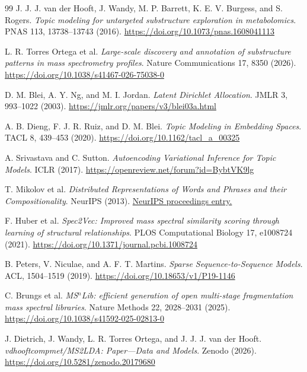 \begin{thebibliography}{99}
J. J. J. van der Hooft, J. Wandy, M. P. Barrett, K. E. V. Burgess, and
S. Rogers. \emph{Topic modeling for untargeted substructure exploration in
metabolomics}. PNAS 113, 13738--13743 (2016).
\url{https://doi.org/10.1073/pnas.1608041113}

L. R. Torres Ortega et al. \emph{Large-scale discovery and annotation of
substructure patterns in mass spectrometry profiles}.
Nature Communications 17, 8350 (2026).
\url{https://doi.org/10.1038/s41467-026-75038-0}

D. M. Blei, A. Y. Ng, and M. I. Jordan. \emph{Latent Dirichlet Allocation}.
JMLR 3, 993--1022 (2003).
\url{https://jmlr.org/papers/v3/blei03a.html}

A. B. Dieng, F. J. R. Ruiz, and D. M. Blei. \emph{Topic Modeling in Embedding
Spaces}. TACL 8, 439--453 (2020).
\url{https://doi.org/10.1162/tacl_a_00325}

A. Srivastava and C. Sutton. \emph{Autoencoding Variational Inference for
Topic Models}. ICLR (2017).
\url{https://openreview.net/forum?id=BybtVK9lg}

T. Mikolov et al. \emph{Distributed Representations of Words and Phrases
and their Compositionality}. NeurIPS (2013).
\href{https://proceedings.neurips.cc/paper/2013/hash/9aa42b31882ec039965f3c4923ce901b-Abstract.html}{NeurIPS proceedings entry.}

F. Huber et al. \emph{Spec2Vec: Improved mass spectral similarity scoring
through learning of structural relationships}. PLOS Computational Biology 17,
e1008724 (2021).
\url{https://doi.org/10.1371/journal.pcbi.1008724}

B. Peters, V. Niculae, and A. F. T. Martins. \emph{Sparse Sequence-to-Sequence
Models}. ACL, 1504--1519 (2019).
\url{https://doi.org/10.18653/v1/P19-1146}

C. Brungs et al. \emph{MS$^{n}$Lib: efficient generation of open multi-stage
fragmentation mass spectral libraries}. Nature Methods 22, 2028--2031 (2025).
\url{https://doi.org/10.1038/s41592-025-02813-0}

J. Dietrich, J. Wandy, L. R. Torres Ortega, and J. J. J. van der Hooft.
\emph{vdhooftcompmet/MS2LDA: Paper---Data and Models}. Zenodo (2026).
\url{https://doi.org/10.5281/zenodo.20179680}


\end{thebibliography}
